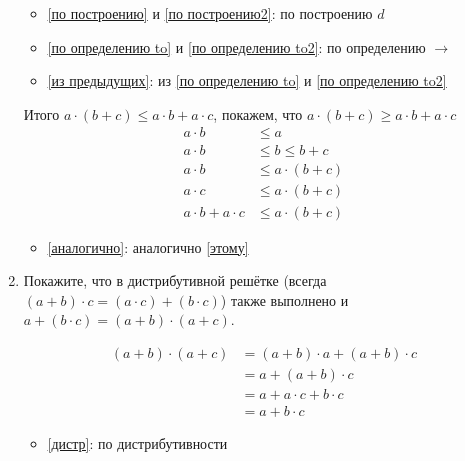 \begin{enumerate}
            \begin{itemize}
                  \item \eqref{по построению} и \eqref{по построению2}: по построению \(d\)
                  \item \eqref{по определению to} и \eqref{по определению to2}: по определению \( \to \)
                  \item \eqref{из предыдущих}: из \eqref{по определению to} и \eqref{по определению to2}
            \end{itemize}

            Итого \(a\cdot (b + c) \leq a\cdot b + a\cdot c\), покажем, что \(a\cdot (b + c) \geq a\cdot b + a\cdot c\)
            \begin{align}
                  a \cdot b             & \leq a                                  \\
                  a \cdot b             & \leq b \leq b + c                       \\
                  a \cdot b             & \leq a \cdot (b + c) \label{этому}      \\
                  a \cdot c             & \leq a \cdot (b + c) \label{аналогично} \\
                  a \cdot b + a \cdot c & \leq a \cdot (b + c)
            \end{align}
            \begin{itemize}
                  \item \eqref{аналогично}: аналогично \eqref{этому}
            \end{itemize}

      \item Покажите, что в дистрибутивной решётке (всегда $(a + b)\cdot c = (a \cdot c) + (b \cdot c)$) также выполнено
            и $a + (b \cdot c) = (a + b) \cdot (a + c)$.

            \begin{align}
                  (a + b) \cdot (a + c) & = (a + b) \cdot a + (a + b) \cdot c \label{дистр} \\
                                        & = a + (a + b) \cdot c                             \\
                                        & = a + a \cdot c + b \cdot c                       \\
                                        & = a + b \cdot c
            \end{align}

            \begin{itemize}
                  \item \eqref{дистр}: по дистрибутивности
            \end{itemize}


\end{enumerate}
